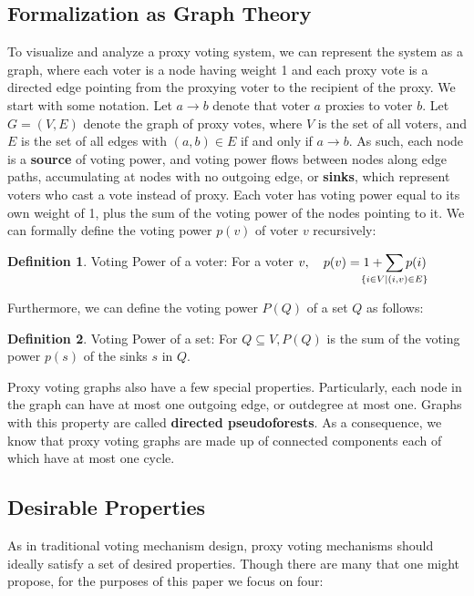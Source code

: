 \documentclass[10pt]{article}
\theoremstyle{definition}
\newtheorem{definition}{Definition}[section]
\begin{document}
\subsection{Formalization as Graph Theory}
To visualize and analyze a proxy voting system, we can represent the system as a graph, where each voter is a node having weight 1 and each proxy vote is a directed edge pointing from the proxying voter to the recipient of the proxy. We start with some notation. Let $a \rightarrow b$ denote that voter $a$ proxies to voter $b$. Let $G = (V,E)$ denote the graph of proxy votes, where $V$ is the set of all voters, and $E$ is the set of all edges with $(a,b) \in E$ if and only if $a \rightarrow b$. As such, each node is a \textbf{source} of voting power, and voting power flows between nodes along edge paths, accumulating at nodes with no outgoing edge, or \textbf{sinks}, which represent voters who cast a vote instead of proxy. Each voter has voting power equal to its own weight of 1, plus the sum of the voting power of the nodes pointing to it. We can formally define the voting power $p(v)$ of voter $v$ recursively:

\theoremstyle{definition}
\begin{definition}{Voting Power of a voter:}
For a voter $v, \quad p(v) = 1 + \smashoperator{\sum\limits_{\{i \in V \mid (i,v) \in E\}}}p(i)$
\end{definition}

Furthermore, we can define the voting power $P(Q)$ of a set $Q$ as follows:

\theoremstyle{definition}
\begin{definition}{Voting Power of a set:}
For $Q \subseteq V, P(Q)$ is the sum of the voting power $p(s)$ of the sinks $s$ in $Q$.
\end{definition}



Proxy voting graphs also have a few special properties. Particularly, each node in the graph can have at most one outgoing edge, or outdegree at most one. Graphs with this property are called \textbf{directed pseudoforests}. As a consequence, we know that proxy voting graphs are made up of connected components each of which have at most one cycle.


\subsection{Desirable Properties}
As in traditional voting mechanism design, proxy voting mechanisms should ideally satisfy a set of desired properties. Though there are many that one might propose, for the purposes of this paper we focus on four:
\end{document}
